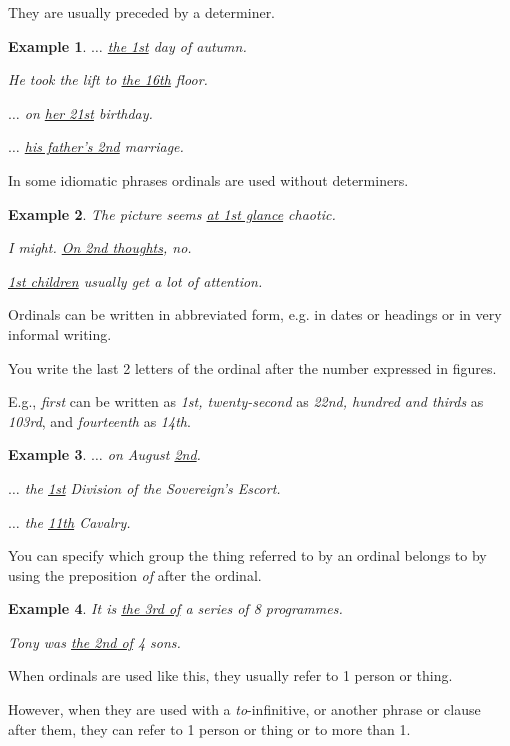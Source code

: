\documentclass[oneside]{book}
\numberwithin{equation}{section}
\newtheorem{example}{Example}[section]
\begin{document}
They are usually preceded by a determiner.
\begin{example}
    $\ldots$ \underline{the 1st} day of autumn.
    
    He took the lift to \underline{the 16th} floor.
    
    $\ldots$ on \underline{her 21st} birthday.
    
    $\ldots$ \underline{his father's 2nd} marriage.
\end{example}
In some idiomatic phrases ordinals are used without determiners.
\begin{example}
    The picture seems \underline{at 1st glance} chaotic.
    
    I might. \underline{On 2nd thoughts}, no.
    
    \underline{1st children} usually get a lot of attention.
\end{example}
%
\noindent{} Ordinals can be written in abbreviated form, e.g. in dates or headings or in very informal writing.

You write the last 2 letters of the ordinal after the number expressed in figures.

E.g., \textit{first} can be written as \textit{1st, twenty-second} as \textit{22nd, hundred and thirds} as \textit{103rd}, and \textit{fourteenth} as \textit{14th}.
\begin{example}
    $\ldots$ on August \underline{2nd}.
    
    $\ldots$ the \underline{1st} Division of the Sovereign's Escort.
    
    $\ldots$ the \underline{11th} Cavalry.
\end{example}
%
\noindent{} You can specify which group the thing referred to by an ordinal belongs to by using the preposition \textit{of} after the ordinal.
\begin{example}
    It is \underline{the 3rd of} a series of 8 programmes.
    
    Tony was \underline{the 2nd of} 4 sons.
\end{example}
When ordinals are used like this, they usually refer to 1 person or thing.

However, when they are used with a \textit{to}-infinitive, or another phrase or clause after them, they can refer to 1 person or thing or to more than 1.
\end{document}
